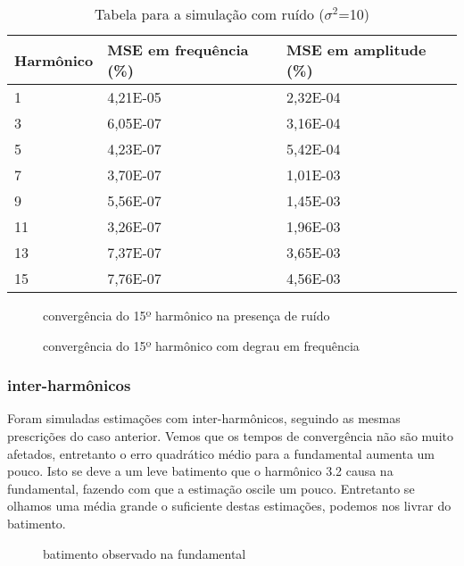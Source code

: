 \documentclass[a4paper, 12pt]{book}
\begin{document}
\begin{table}[H]
	\centering
	\begin{tabular}{|p{2.5cm}|p{2.5cm}|p{2.5cm}|}
		\hline
		Harmônico & MSE em frequência (\%) & MSE em amplitude (\%)\\
		\hline
		1  & 4,21E-05 & 2,32E-04 \\
		3  & 6,05E-07 & 3,16E-04 \\
		5  & 4,23E-07 & 5,42E-04 \\
		7  & 3,70E-07 & 1,01E-03 \\
		9  & 5,56E-07 & 1,45E-03 \\
		11 & 3,26E-07 & 1,96E-03 \\
		13 & 7,37E-07 & 3,65E-03 \\
		15 & 7,76E-07 & 4,56E-03 \\
		\hline
	\end{tabular}
	\caption{Tabela para a simulação com ruído ($\sigma ^2$=10)}
\end{table}

\begin{figure}[H]
	\centering    
	\def\svgscale{1}
	
	\caption{convergência do 15º harmônico na presença de ruído}
	\label{fig:esquema_pll}
\end{figure}

\begin{figure}[H]
	\centering    
	\def\svgscale{1}
	
	\caption{convergência do 15º harmônico com degrau em frequência}
	\label{fig:esquema_pll}
\end{figure}

\subsubsection{inter-harmônicos}

Foram simuladas estimações com inter-harmônicos, seguindo as mesmas prescrições do caso anterior. Vemos que os tempos de convergência não são muito afetados, entretanto o erro quadrático médio para a fundamental aumenta um pouco. Isto se deve a um leve batimento que o harmônico 3.2 causa na fundamental, fazendo com que a estimação oscile um pouco. Entretanto se olhamos uma média grande o suficiente destas estimações, podemos nos livrar do batimento.

\begin{figure}[H]
	\centering    
	\def\svgscale{1}
	
	\caption{batimento observado na fundamental}
	\label{fig:esquema_pll}
\end{figure}
\end{document}
